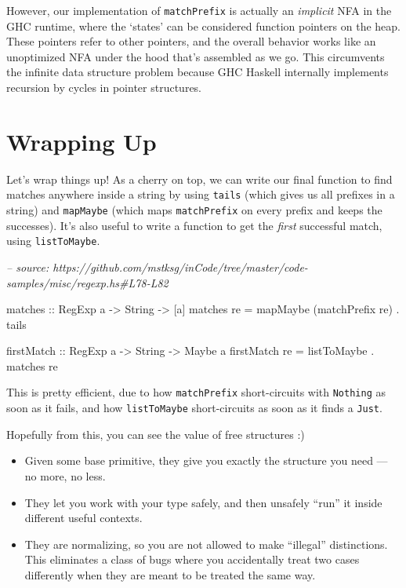 \documentclass[]{article}
\newenvironment{Shaded}{}{}
\newcommand{\CommentTok}[1]{\textcolor[rgb]{0.38,0.63,0.69}{\textit{#1}}}
\newcommand{\DataTypeTok}[1]{\textcolor[rgb]{0.56,0.13,0.00}{#1}}
\newcommand{\FunctionTok}[1]{\textcolor[rgb]{0.02,0.16,0.49}{#1}}
\newcommand{\NormalTok}[1]{#1}
\newcommand{\OtherTok}[1]{\textcolor[rgb]{0.00,0.44,0.13}{#1}}
\begin{document}
However, our implementation of \texttt{matchPrefix} is actually an
\emph{implicit} NFA in the GHC runtime, where the `states' can be considered
function pointers on the heap. These pointers refer to other pointers, and the
overall behavior works like an unoptimized NFA under the hood that's assembled
as we go. This circumvents the infinite data structure problem because GHC
Haskell internally implements recursion by cycles in pointer structures.

\hypertarget{wrapping-up}{%
\section{Wrapping Up}\label{wrapping-up}}

Let's wrap things up! As a cherry on top, we can write our final function to
find matches anywhere inside a string by using \texttt{tails} (which gives us
all prefixes in a string) and \texttt{mapMaybe} (which maps \texttt{matchPrefix}
on every prefix and keeps the successes). It's also useful to write a function
to get the \emph{first} successful match, using \texttt{listToMaybe}.

\begin{Shaded}
\begin{Highlighting}[]
\CommentTok{-- source: https://github.com/mstksg/inCode/tree/master/code-samples/misc/regexp.hs#L78-L82}

\OtherTok{matches ::} \DataTypeTok{RegExp}\NormalTok{ a }\OtherTok{->} \DataTypeTok{String} \OtherTok{->}\NormalTok{ [a]}
\NormalTok{matches re }\FunctionTok{=}\NormalTok{ mapMaybe (matchPrefix re) }\FunctionTok{.}\NormalTok{ tails}

\OtherTok{firstMatch ::} \DataTypeTok{RegExp}\NormalTok{ a }\OtherTok{->} \DataTypeTok{String} \OtherTok{->} \DataTypeTok{Maybe}\NormalTok{ a}
\NormalTok{firstMatch re }\FunctionTok{=}\NormalTok{ listToMaybe }\FunctionTok{.}\NormalTok{ matches re}
\end{Highlighting}
\end{Shaded}

This is pretty efficient, due to how \texttt{matchPrefix} short-circuits with
\texttt{Nothing} as soon as it fails, and how \texttt{listToMaybe}
short-circuits as soon as it finds a \texttt{Just}.

Hopefully from this, you can see the value of free structures :)

\begin{itemize}
\tightlist
\item
  Given some base primitive, they give you exactly the structure you need --- no
  more, no less.
\item
  They let you work with your type safely, and then unsafely ``run'' it inside
  different useful contexts.
\item
  They are normalizing, so you are not allowed to make ``illegal'' distinctions.
  This eliminates a class of bugs where you accidentally treat two cases
  differently when they are meant to be treated the same way.
\end{itemize}
\end{document}
